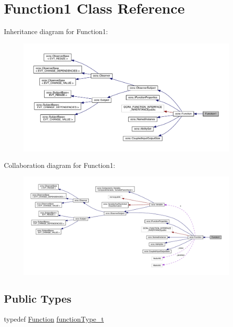 \hypertarget{classFunction1}{}\section{Function1 Class Reference}
\label{classFunction1}


Inheritance diagram for Function1\+:\nopagebreak
\begin{figure}[H]
\begin{center}
\leavevmode
\includegraphics[width=350pt]{dc/d8a/classFunction1__inherit__graph}
\end{center}
\end{figure}


Collaboration diagram for Function1\+:\nopagebreak
\begin{figure}[H]
\begin{center}
\leavevmode
\includegraphics[width=350pt]{dd/d0a/classFunction1__coll__graph}
\end{center}
\end{figure}
\subsection*{Public Types}
\begin{DoxyCompactItemize}
\item 
typedef \hyperlink{classocra_1_1Function}{Function} \hyperlink{classFunction1_a3248b79eedbe37ed0e285db564a530fe}{function\+Type\+\_\+t}
\end{DoxyCompactItemize}
